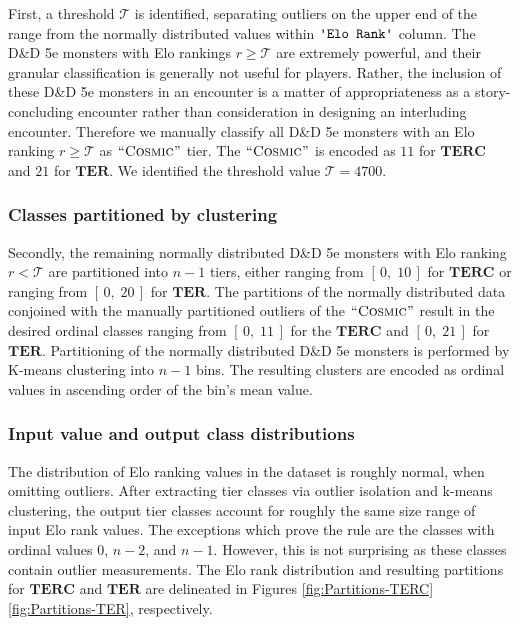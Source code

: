 \documentclass{article}
\newcommand{\Qty}[1]{\oldstylenums{#1}}
\newcommand{\TER}{\ensuremath{\mathbf{TER}}\xspace}
\newcommand{\TERC}{\ensuremath{\mathbf{TERC}}\xspace}
\newcommand{\DnD}{D\&D 5e\xspace}
\newcommand{\Column}[1]{\ensuremath{\texttt{\textquotesingle{}#1\textquotesingle{}}}\xspace}
\newcommand{\NumericRange}[2]{\ensuremath{\left[\,#1,\; #2\,\right]}\xspace}
\newcommand{\TierCosmic}{\ensuremath{\textsc{``Cosmic''}}\xspace}
\begin{document}
First, a threshold $\mathcal{T}$ is identified, separating outliers on the upper end of the range from the normally distributed values within \Column{Elo Rank} column.
The \DnD monsters with Elo rankings $r \ge \mathcal{T}$ are extremely powerful, and their granular classification is generally not useful for players.
Rather, the inclusion of these \DnD monsters in an encounter is a matter of appropriateness as a story-concluding encounter rather than consideration in designing an interluding encounter.
Therefore we manually classify all \DnD monsters with an Elo ranking $r \ge \mathcal{T}$ as \TierCosmic tier.
The \TierCosmic is encoded as $11$ for \TERC and $21$ for \TER.
We identified the threshold value $\mathcal{T} = 4700$.


\subsubsection{Classes partitioned by clustering}

Secondly, the remaining normally distributed \DnD monsters with Elo ranking $r < \mathcal{T}$ are partitioned into $n - 1$ tiers, either \Qty{11} ranging from \NumericRange{0}{10} for \TERC or \Qty{21} ranging from \NumericRange{0}{20} for \TER.
The partitions of the normally distributed data conjoined with the manually partitioned outliers of the \TierCosmic result in the desired ordinal classes ranging from \NumericRange{0}{11} for the \TERC and \NumericRange{0}{21} for \TER.
Partitioning of the normally distributed \DnD monsters is performed by K-means clustering into $n - 1$ bins.
The resulting clusters are encoded as ordinal values in ascending order of the bin's mean value.


\subsubsection{Input value and output class distributions}

The distribution of Elo ranking values in the dataset is roughly normal, when omitting outliers.
After extracting tier classes via outlier isolation and k-means clustering, the output tier classes account for roughly the same size range of input Elo rank values.
The exceptions which prove the rule are the classes with ordinal values $0$, $n- 2$, and $n - 1$.
However, this is not surprising as these classes contain outlier measurements.
The Elo rank distribution and resulting partitions for \TERC and \TER are delineated in Figures \ref{fig:Partitions-TERC} \ref{fig:Partitions-TER}, respectively.
 
\end{document}
